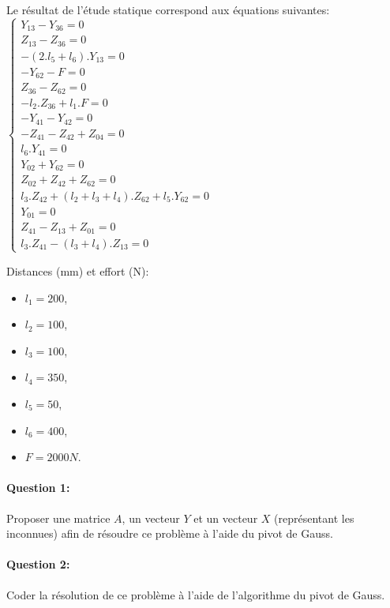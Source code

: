 \begin{minipage}{0.45\linewidth}
Le résultat de l'étude statique correspond aux équations suivantes: \\
$\left\{\begin{array}{l}
Y_{13}-Y_{36}=0 \\ Z_{13}-Z_{36}=0 \\ -(2.l_5+l_6).Y_{13}=0 \\
-Y_{62}-F=0 \\ Z_{36}-Z_{62}=0 \\ -l_2.Z_{36}+l_1.F=0 \\
-Y_{41}-Y_{42}=0 \\ -Z_{41}-Z_{42}+Z_{04}=0 \\ l_6.Y_{41}=0 \\
Y_{02}+Y_{62}=0 \\ Z_{02}+Z_{42}+Z_{62}=0 \\ l_3.Z_{42}+(l_2+l_3+l_4).Z_{62}+l_5.Y_{62}=0 \\
Y_{01}=0 \\ Z_{41}-Z_{13}+Z_{01}=0 \\ l_3.Z_{41}-(l_3+l_4).Z_{13}=0 \end{array}\right.$
\end{minipage}
\hfill
\begin{minipage}{0.45\linewidth}
Distances (mm) et effort (N):
\begin{itemize}
 \item $l_1=200$,
 \item $l_2=100$,
 \item $l_3=100$,
 \item $l_4=350$,
 \item $l_5=50$,
 \item $l_6=400$,
 \item $F=2000N$.
\end{itemize}
\end{minipage}

\paragraph{Question 1:} Proposer une matrice $A$, un vecteur $Y$ et un vecteur $X$ (représentant les inconnues) afin de résoudre ce problème à l'aide du pivot de Gauss.

\paragraph{Question 2:} Coder la résolution de ce problème à l'aide de l'algorithme du pivot de Gauss.


